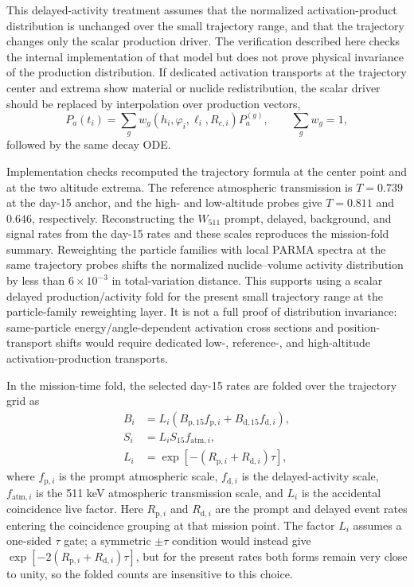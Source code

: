 \documentclass[11pt]{article}
\newcommand{\wii}{W_{511}}
\begin{document}
This delayed-activity treatment assumes that the normalized activation-product
distribution is unchanged over the small trajectory range, and that the
trajectory changes only the scalar production driver. The verification
described here checks the internal implementation of that model but does not
prove physical invariance of the production distribution. If dedicated activation transports at the trajectory center and
extrema show material or nuclide redistribution, the scalar driver should be
replaced by interpolation over production vectors,
\begin{equation}
  P_a(t_i)=\sum_g w_g(h_i,\varphi_i,\ell_i,R_{c,i})P_a^{(g)},\qquad
  \sum_g w_g=1,
\end{equation}
followed by the same decay ODE.

Implementation checks recomputed the trajectory formula at the center point and
at the two altitude extrema. The reference atmospheric transmission is
$T=0.739$ at the day-15 anchor, and the high- and low-altitude probes give
$T=0.811$ and $0.646$, respectively. Reconstructing the $\wii$ prompt,
delayed, background, and signal rates from the day-15 rates and these scales
reproduces the mission-fold summary. Reweighting the particle families with local PARMA spectra at the same trajectory probes shifts the normalized nuclide--volume activity distribution by less than $6\times10^{-3}$ in total-variation distance. This supports using a scalar delayed
production/activity fold for the present small trajectory range at the
particle-family reweighting layer. It is not a full proof of distribution
invariance: same-particle energy/angle-dependent activation cross sections and
position-transport shifts would require dedicated low-, reference-, and
high-altitude activation-production transports.

In the mission-time fold, the selected day-15 rates are folded over the
trajectory grid as
\begin{align}
  B_i &= L_i\left(B_{\mathrm{p},15} f_{\mathrm{p},i}
        + B_{\mathrm{d},15} f_{\mathrm{d},i}\right),\\
  S_i &= L_i S_{15} f_{\mathrm{atm},i},\\
  L_i &= \exp[-(R_{\mathrm{p},i}+R_{\mathrm{d},i})\tau],
\end{align}
where $f_{\mathrm{p},i}$ is the prompt atmospheric scale,
$f_{\mathrm{d},i}$ is the delayed-activity scale, $f_{\mathrm{atm},i}$ is the
511 keV atmospheric transmission scale, and $L_i$ is the accidental
coincidence live factor. Here $R_{\mathrm{p},i}$ and $R_{\mathrm{d},i}$ are the
prompt and delayed event rates entering the coincidence grouping at that mission point. The factor $L_i$ assumes a one-sided $\tau$ gate; a symmetric $\pm\tau$ condition would instead give $\exp[-2(R_{\mathrm{p},i}+R_{\mathrm{d},i})\tau]$, but for the present rates both forms remain very close to unity, so the folded counts are insensitive to this choice.
\end{document}
